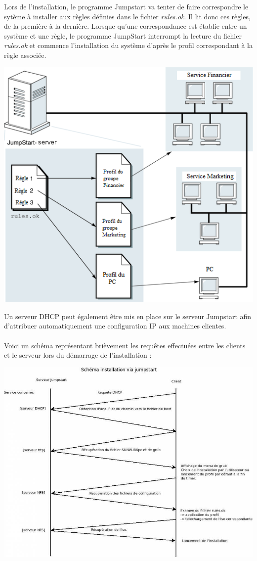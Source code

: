 \documentclass[a4paper,12pt,one side,titlepage]{report}
\begin{document}
Lors de l'installation, le programme Jumpstart va tenter de faire correspondre le sytème à installer aux règles définies dans le fichier \textit{rules.ok}. Il lit donc ces règles, de la première à la dernière. Lorsque qu'une correspondance est établie entre un système et une règle, le programme JumpStart interrompt la lecture du fichier \textit{rules.ok} et commence l'installation du système d'après le profil correspondant à la règle associée.\\
\begin{center}\includegraphics[scale=0.7]{./img/jumpstart2.png}\end{center}
\vspace{1em}
Un serveur DHCP peut également être mis en place sur le serveur Jumpstart afin d'attribuer automatiquement une configuration IP aux machines clientes.\\\\
Voici un schéma représentant brièvement les requêtes effectuées entre les clients et le serveur lors du démarrage de l'installation :\\
\begin{center}\includegraphics[scale=0.4]{./img/jumpstart.jpeg}\end{center}
\end{document}
